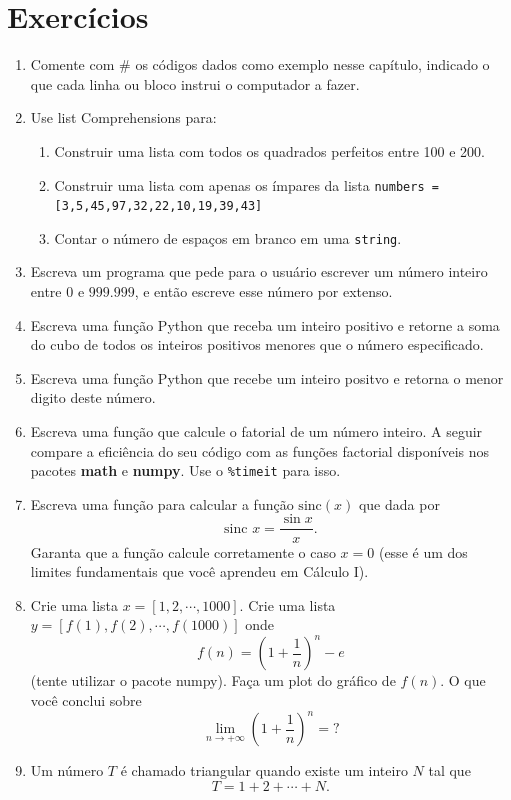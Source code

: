 \section{Exercícios}
\begin{enumerate}
    \item Comente com $\#$ os códigos dados como exemplo nesse capítulo, indicado o que cada linha ou bloco instrui o computador a fazer.
    \item Use list Comprehensions para:
    \begin{enumerate}
        \item Construir uma lista com todos os quadrados perfeitos entre 100 e 200.
        \item Construir uma lista com apenas os ímpares da lista {\tt numbers = [3,5,45,97,32,22,10,19,39,43]}
        \item Contar o número de espaços em branco em uma {\tt string}.
    \end{enumerate}
    \item Escreva um programa que pede para o usuário escrever um número inteiro entre $0$ e $999.999$, e então escreve esse número por extenso.
    \item Escreva uma função Python que receba um inteiro positivo e retorne a soma do cubo de todos os inteiros positivos menores que o número especificado.
    \item Escreva uma função Python que recebe um inteiro positvo e retorna o menor digito deste número.
    \item Escreva uma função que calcule o fatorial de um número inteiro. A seguir compare a eficiência do seu código com as funções factorial disponíveis nos pacotes {\bf math} e {\bf numpy}. Use o {\tt \%timeit} para isso.
    \item Escreva uma função para calcular a função $\text{sinc}(x)$ que dada por
    \[ \text{sinc } x = \frac{\sin x}{x}.\]
    Garanta que a função calcule corretamente o caso $x=0$ (esse é um dos limites fundamentais que você aprendeu em Cálculo I).
    \item Crie uma lista $x=[1,2,\cdots,1000]$. Crie uma lista $y=[f(1), f(2), \cdots, f(1000)]$ onde 
    \[ f(n) = \left(1 + \frac{1}{n}\right)^n - e\]
    (tente utilizar o pacote numpy). Faça um plot do gráfico de $f(n)$. O que você conclui sobre
    \[ \lim_{n \rightarrow + \infty} \left(1 + \frac{1}{n}\right)^n = ? \]
    \item Um número $T$ é chamado triangular quando existe um inteiro $N$ tal que
    \[ T = 1+2+ \cdots+ N.\]

\end{enumerate}
